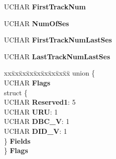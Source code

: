 \begin{DoxyCompactItemize}
\begin{tabbing}
\end{tabbing}\item 
\mbox{\label{struct___d_i_s_c___i_n_f_o___b_l_o_c_k___u_s_e_r___o_u_t_a37e8c0eca2d93c8a32877514d182ded6}} 
U\+C\+H\+AR {\bfseries First\+Track\+Num}
\item 
\mbox{\label{struct___d_i_s_c___i_n_f_o___b_l_o_c_k___u_s_e_r___o_u_t_a511da09282630fe954b5fe1272bee96f}} 
U\+C\+H\+AR {\bfseries Num\+Of\+Ses}
\item 
\mbox{\label{struct___d_i_s_c___i_n_f_o___b_l_o_c_k___u_s_e_r___o_u_t_a2537120613745bb93c15ea9b57c4a753}} 
U\+C\+H\+AR {\bfseries First\+Track\+Num\+Last\+Ses}
\item 
\mbox{\label{struct___d_i_s_c___i_n_f_o___b_l_o_c_k___u_s_e_r___o_u_t_ac1f57f95bed0e40f021f87c8168939f7}} 
U\+C\+H\+AR {\bfseries Last\+Track\+Num\+Last\+Ses}
\item 
\mbox{\label{struct___d_i_s_c___i_n_f_o___b_l_o_c_k___u_s_e_r___o_u_t_a957ac3b4968793ba563bafcb7bea0b36}} 
\begin{tabbing}
xx\=xx\=xx\=xx\=xx\=xx\=xx\=xx\=xx\=\kill
union \{\\
\>UCHAR {\bfseries Flags}\\
\>struct \{\\
\>\>UCHAR {\bfseries Reserved1}: 5\\
\>\>UCHAR {\bfseries URU}: 1\\
\>\>UCHAR {\bfseries DBC\_V}: 1\\
\>\>UCHAR {\bfseries DID\_V}: 1\\
\>\} {\bfseries Fields}\\
\} {\bfseries Flags}\\


\end{tabbing}
\end{DoxyCompactItemize}
